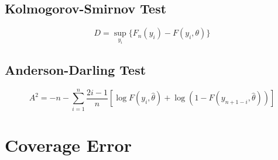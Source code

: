 \subsection{Kolmogorov-Smirnov Test}

\begin{equation}
D = \underset{y_i}{\sup} \{ F_n(y_i) - F(y_i, \theta) \}
\end{equation}

\subsection{Anderson-Darling Test}

\begin{equation}
A^2 = -n - \sum_{i=1}^n \frac{2 i - 1}{n} \left[ \log F(y_i, \hat{\theta}) + \log( 1 - F(y_{n+1-i}, \hat{\theta})) \right]
\end{equation}

\section{Coverage Error}























